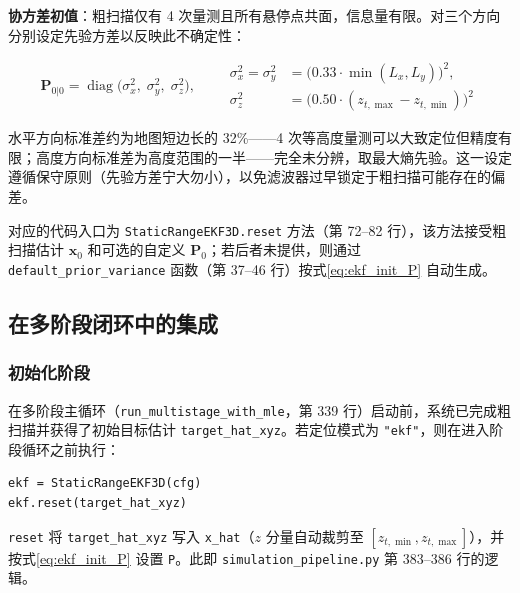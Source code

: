 \textbf{协方差初值}：粗扫描仅有 4 次量测且所有悬停点共面，信息量有限。对三个方向分别设定先验方差以反映此不确定性：

\begin{equation}
\mathbf{P}_{0|0} = \operatorname{diag}\bigl( \sigma_x^2,\; \sigma_y^2,\; \sigma_z^2 \bigr), \qquad
\begin{aligned}
\sigma_x^2 = \sigma_y^2 &= \bigl( 0.33 \cdot \min(L_x, L_y) \bigr)^2, \\
\sigma_z^2 &= \bigl( 0.50 \cdot (z_{t,\max} - z_{t,\min}) \bigr)^2
\end{aligned}
\label{eq:ekf_init_P}
\end{equation}

水平方向标准差约为地图短边长的 32\%——4 次等高度量测可以大致定位但精度有限；高度方向标准差为高度范围的一半——完全未分辨，取最大熵先验。这一设定遵循保守原则（先验方差宁大勿小），以免滤波器过早锁定于粗扫描可能存在的偏差。

对应的代码入口为 \texttt{StaticRangeEKF3D.reset} 方法（第 72--82 行），该方法接受粗扫描估计 $\mathbf{x}_0$ 和可选的自定义 $\mathbf{P}_0$；若后者未提供，则通过 \texttt{default\_prior\_variance} 函数（第 37--46 行）按式\eqref{eq:ekf_init_P} 自动生成。

\subsection{在多阶段闭环中的集成}

\subsubsection{初始化阶段}

在多阶段主循环（\texttt{run\_multistage\_with\_mle}，第 339 行）启动前，系统已完成粗扫描并获得了初始目标估计 \texttt{target\_hat\_xyz}。若定位模式为 \texttt{"ekf"}，则在进入阶段循环之前执行：

\begin{center}
\begin{minipage}{0.85\textwidth}
\begin{verbatim}
ekf = StaticRangeEKF3D(cfg)
ekf.reset(target_hat_xyz)
\end{verbatim}
\end{minipage}
\end{center}

\texttt{reset} 将 \texttt{target\_hat\_xyz} 写入 \texttt{x\_hat}（$z$ 分量自动裁剪至 $[z_{t,\min}, z_{t,\max}]$），并按式\eqref{eq:ekf_init_P} 设置 \texttt{P}。此即 \texttt{simulation\_pipeline.py} 第 383--386 行的逻辑。

